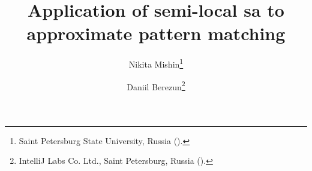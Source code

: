 

\usepackage{lipsum}
\usepackage{amsfonts}
\usepackage{graphicx}
\usepackage{epstopdf}
\usepackage{algorithmic}
\ifpdf
\else
\fi

\newcommand{\creflastconjunction}{, and~}



\title{Application of semi-local sa to approximate pattern matching
}

\author{Nikita Mishin\thanks{Saint Petersburg State University, Russia
    ().}
\and Daniil Berezun\thanks{IntelliJ Labs Co. Ltd., Saint Petersburg, Russia
  ().}}

\usepackage{amsopn}
\DeclareMathOperator{\diag}{diag}


